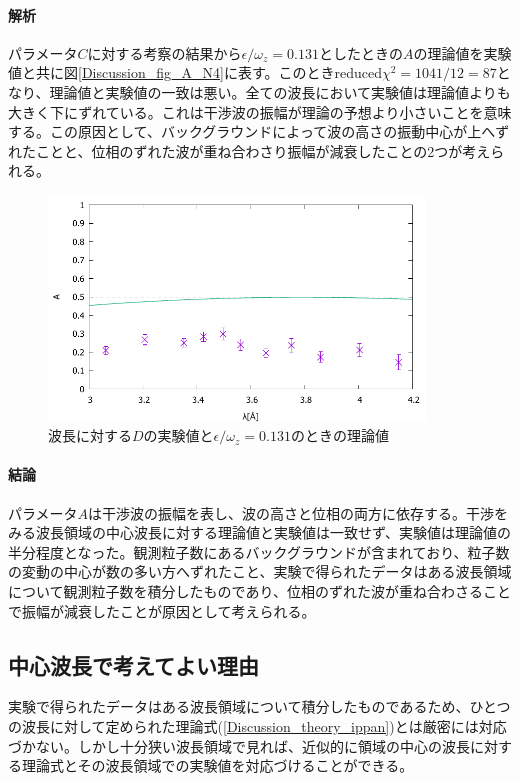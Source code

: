 \paragraph{解析}
パラメータ$C$に対する考察の結果から$\epsilon/\omega_z=0.131$としたときの$A$の理論値を実験値と共に図\ref{Discussion_fig_A_N4}に表す。このときreduced$\chi^2=1041/12=87$となり、理論値と実験値の一致は悪い。全ての波長において実験値は理論値よりも大きく下にずれている。これは干渉波の振幅が理論の予想より小さいことを意味する。この原因として、バックグラウンドによって波の高さの振動中心が上へずれたことと、位相のずれた波が重ね合わさり振幅が減衰したことの2つが考えられる。
\begin{figure}[h]
\centering
\includegraphics[width=10cm]{discussion/A/A_F_N4.pdf}
\caption{波長に対する$D$の実験値と$\epsilon/\omega_z=0.131$のときの理論値}
\end{figure}

\paragraph{結論}
パラメータ$A$は干渉波の振幅を表し、波の高さと位相の両方に依存する。干渉をみる波長領域の中心波長に対する理論値と実験値は一致せず、実験値は理論値の半分程度となった。観測粒子数にあるバックグラウンドが含まれており、粒子数の変動の中心が数の多い方へずれたこと、実験で得られたデータはある波長領域について観測粒子数を積分したものであり、位相のずれた波が重ね合わさることで振幅が減衰したことが原因として考えられる。

\subsection{中心波長で考えてよい理由}
実験で得られたデータはある波長領域について積分したものであるため、ひとつの波長に対して定められた理論式(\ref{Discussion_theory_ippan})とは厳密には対応づかない。しかし十分狭い波長領域で見れば、近似的に領域の中心の波長に対する理論式とその波長領域での実験値を対応づけることができる。

